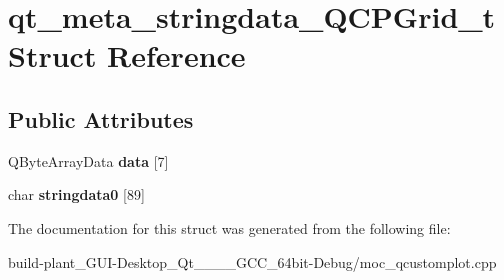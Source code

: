 \hypertarget{structqt__meta__stringdata__QCPGrid__t}{}\section{qt\+\_\+meta\+\_\+stringdata\+\_\+\+Q\+C\+P\+Grid\+\_\+t Struct Reference}
\label{structqt__meta__stringdata__QCPGrid__t}
\subsection*{Public Attributes}
\begin{DoxyCompactItemize}
\item 
\mbox{\label{structqt__meta__stringdata__QCPGrid__t_ad7520be1ee34a662890da1cb1384cf28}} 
Q\+Byte\+Array\+Data {\bfseries data} \mbox{[}7\mbox{]}
\item 
\mbox{\label{structqt__meta__stringdata__QCPGrid__t_a125926539385574413c9ff82323a34ca}} 
char {\bfseries stringdata0} \mbox{[}89\mbox{]}
\end{DoxyCompactItemize}


The documentation for this struct was generated from the following file\+:\begin{DoxyCompactItemize}
\item 
build-\/plant\+\_\+\+G\+U\+I-\/\+Desktop\+\_\+\+Qt\+\_\+\_\+\_\+\_\+\+G\+C\+C\+\_\+64bit-\/\+Debug/moc\+\_\+qcustomplot.\+cpp\end{DoxyCompactItemize}
